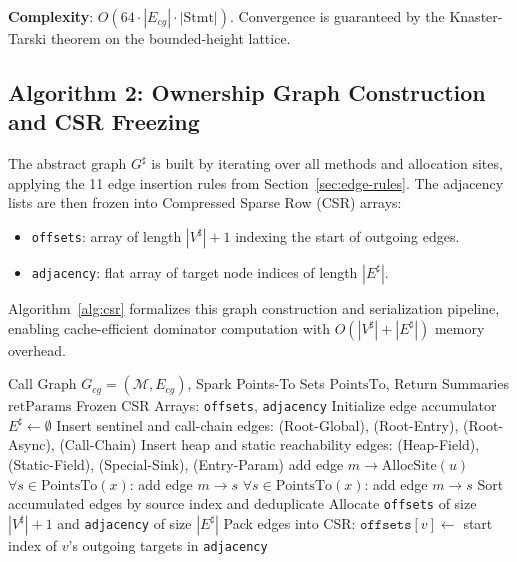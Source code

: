 \documentclass[12pt,a4paper]{article}
\newcommand{\PointsTo}{\text{PointsTo}}
\newcommand{\retParams}{\text{retParams}}
\begin{document}
\textbf{Complexity}: $O(64 \cdot |E_{cg}| \cdot |\text{Stmt}|)$. Convergence is guaranteed by the Knaster-Tarski theorem on the bounded-height lattice.

\subsection{Algorithm 2: Ownership Graph Construction and CSR Freezing}

The abstract graph $G^\sharp$ is built by iterating over all methods and allocation sites, applying the 11 edge insertion rules from Section~\ref{sec:edge-rules}. The adjacency lists are then frozen into Compressed Sparse Row (CSR) arrays:
\begin{itemize}
  \item \texttt{offsets}: array of length $|V^\sharp| + 1$ indexing the start of outgoing edges.
  \item \texttt{adjacency}: flat array of target node indices of length $|E^\sharp|$.
\end{itemize}

Algorithm~\ref{alg:csr} formalizes this graph construction and serialization pipeline, enabling cache-efficient dominator computation with $O(|V^\sharp| + |E^\sharp|)$ memory overhead.

\begin{algorithm}[H]
\caption{Ownership Graph Construction and CSR Freezing}
\label{alg:csr}
\begin{algorithmic}[1]
\Require Call Graph $G_{cg} = (\mathcal{M}, E_{cg})$, Spark Points-To Sets $\PointsTo$, Return Summaries $\retParams$
\Ensure Frozen CSR Arrays: \texttt{offsets}, \texttt{adjacency}
\State Initialize edge accumulator $E^\sharp \gets \emptyset$
\State Insert sentinel and call-chain edges: (Root-Global), (Root-Entry), (Root-Async), (Call-Chain)
\State Insert heap and static reachability edges: (Heap-Field), (Static-Field), (Special-Sink), (Entry-Param)
     add edge $m \to \text{AllocSite}(u)$ 
    \ElsIf{$u \equiv x = y.p(\vec{z})$ and $\top \in \retParams(p)$}
      \State $\forall s \in \PointsTo(x)$: add edge $m \to s$ 
      \State $\forall s \in \PointsTo(x)$: add edge $m \to s$ 
    \EndIf
  \EndFor
\EndFor
\State Sort accumulated edges by source index and deduplicate
\State Allocate \texttt{offsets} of size $|V^\sharp| + 1$ and \texttt{adjacency} of size $|E^\sharp|$
\State Pack edges into CSR: $\texttt{offsets}[v] \gets$ start index of $v$'s outgoing targets in \texttt{adjacency}
\end{algorithmic}
\end{algorithm}
\end{document}
